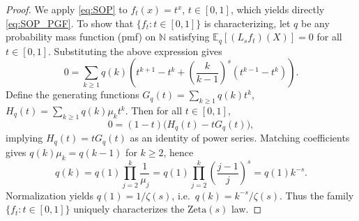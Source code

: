 \documentclass[10pt,a4paper]{amsart}
\begin{document}
\begin{proof}
We apply \eqref{eq:SOP} to $f_t(x)=t^x$, $t\in[0,1]$, which yields directly \eqref{eq:SOP_PGF}. To show that $\{f_t:t\in[0,1]\}$ is characterizing, let $q$ be any probability mass function (pmf) on $\mathbb{N}$ satisfying
$\mathbb{E}_q[(L_s f_t)(X)]=0$ for all $t\in[0,1]$.
Substituting the above expression gives
\[
0=\sum_{k\ge1} q(k)\left(t^{k+1}-t^k + \left(\frac{k}{k-1}\right)^s \left(t^{k-1}-t^k\right)\right).
\]
Define  the generating functions
$G_q(t)=\sum_{k\ge1} q(k)t^k$,
$H_q(t)=\sum_{k\ge1} q(k)\mu_k t^k$.
Then for all $t\in[0,1]$,
\[
0=(1-t)\big(H_q(t)-tG_q(t)\big),
\]
implying $H_q(t)=tG_q(t)$ as an identity of power series.
Matching coefficients gives $q(k)\mu_k=q(k-1)$ for $k\ge2$, hence
\[
q(k)=q(1)\prod_{j=2}^k \frac{1}{\mu_j}
= q(1)\prod_{j=2}^k \left(\frac{j-1}{j}\right)^s
= q(1)k^{-s}.
\]
Normalization yields $q(1)=1/\zeta(s)$, i.e.\ $q(k)=k^{-s}/\zeta(s)$.
Thus the family $\{f_t:t\in[0,1]\}$ uniquely characterizes the $\mathrm{Zeta}(s)$ law.
\end{proof}
\end{document}
